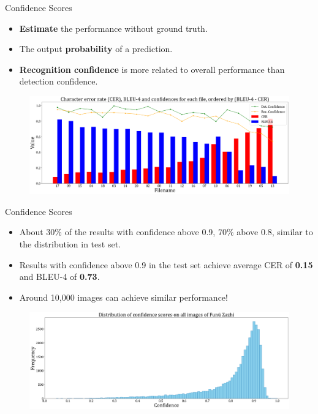 \documentclass{beamer}
\begin{document}
\begin{frame}
    \begin{center}
        \Large{Confidence Scores}
    \end{center}
    \begin{itemize}
        \item \textbf{Estimate} the performance without ground truth.
        \item The output \textbf{probability} of a prediction.
        \item \textbf{Recognition confidence} is more related to overall performance than detection confidence.
    \end{itemize}
    \begin{figure}
        \centering
        \includegraphics[width=\textwidth]{figures/cer_bleu_conf.png}
    \end{figure}
\end{frame}

\begin{frame}
    \begin{center}
        \Large{Confidence Scores}
    \end{center}
    \begin{itemize}
        \item About 30\% of the results with confidence above 0.9, 70\% above 0.8, similar to the distribution in test set.
        \item Results with confidence above 0.9 in the test set achieve average CER of \textbf{0.15} and BLEU-4 of \textbf{0.73}.
        \item Around 10,000 images can achieve similar performance!
    \end{itemize}
    \begin{figure}
        \centering
        \includegraphics[width=\textwidth]{figures/confidence1.png}
    \end{figure}
\end{frame}
\end{document}
